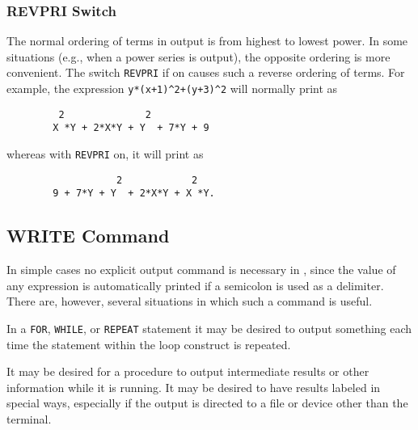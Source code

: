 \subsubsection{REVPRI Switch}

The normal ordering of terms in output is from highest to lowest power.
In some situations (e.g., when a power series is output), the opposite
ordering is more convenient.  The switch {\tt REVPRI} if on causes such a
reverse ordering of terms.  For example, the expression
{\tt y*(x+1)\verb|^|2+(y+3)\verb|^|2} will normally print as
\begin{verbatim}
         2              2
        X *Y + 2*X*Y + Y  + 7*Y + 9
\end{verbatim}
whereas with {\tt REVPRI} on, it will print as
\begin{verbatim}
                   2            2
        9 + 7*Y + Y  + 2*X*Y + X *Y.
\end{verbatim}

\subsection{WRITE Command}

In simple cases no explicit output command is necessary in
{\REDUCE}, since the value of any expression is automatically printed if a
semicolon is used as a delimiter.  There are, however, several situations
in which such a command is useful.

In a {\tt FOR}, {\tt WHILE}, or {\tt REPEAT} statement it may be desired
to output something each time the statement within the loop construct is
repeated.

It may be desired for a procedure to output intermediate results or other
information while it is running. It may be desired to have results labeled
in special ways, especially if the output is directed to a file or device
other than the terminal.


